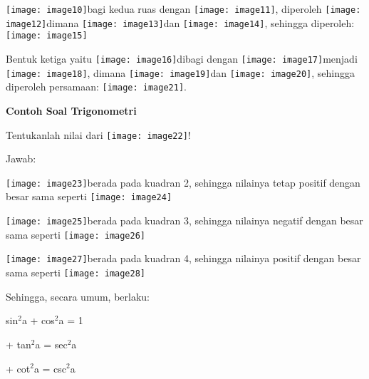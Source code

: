 \documentclass[11pt,fleqn]{book} %
\begin{document}
\begin{myEnumerate}
\begin{itemize}
\noindent \texttt{[image: image10]}bagi kedua ruas dengan \texttt{[image: image11]}, diperoleh \texttt{[image: image12]}dimana \texttt{[image: image13]}dan \texttt{[image: image14]}, sehingga diperoleh: \texttt{[image: image15]}

\noindent Bentuk ketiga yaitu \texttt{[image: image16]}dibagi dengan \texttt{[image: image17]}menjadi \texttt{[image: image18]}, dimana \texttt{[image: image19]}dan \texttt{[image: image20]}, sehingga diperoleh persamaan: \texttt{[image: image21]}.

\noindent \textbf{Contoh Soal Trigonometri}

\noindent Tentukanlah nilai dari \texttt{[image: image22]}!

\noindent Jawab:

\noindent \texttt{[image: image23]}berada pada kuadran 2, sehingga nilainya tetap positif dengan besar sama seperti \texttt{[image: image24]}

\noindent \texttt{[image: image25]}berada pada kuadran 3, sehingga nilainya negatif dengan besar sama seperti \texttt{[image: image26]}

\noindent \texttt{[image: image27]}berada pada kuadran 4, sehingga nilainya positif dengan besar sama seperti \texttt{[image: image28]}

\noindent Sehingga, secara umum, berlaku:

\noindent sin${}^{2}$a + cos${}^{2}$a = 1

 + tan${}^{2}$a = sec${}^{2}$a

 + cot${}^{2}$a = csc${}^{2}$a


\end{itemize}
\end{myEnumerate}
\end{document}
